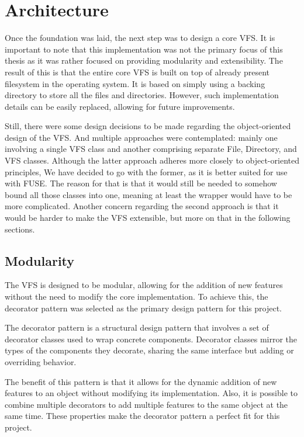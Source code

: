 \section{Architecture}\label{sec:architecture}

Once the foundation was laid, the next step was to design a core VFS\@.
It is important to note that this implementation was not the primary focus of this thesis as it was rather focused on providing modularity and extensibility.
The result of this is that the entire core VFS is built on top of already present filesystem in the operating system.
It is based on simply using a backing directory to store all the files and directories.
However, such implementation details can be easily replaced, allowing for future improvements.

Still, there were some design decisions to be made regarding the object-oriented design of the VFS\@.
And multiple approaches were contemplated: mainly one involving a single VFS class and another comprising separate File, Directory, and VFS classes.
Although the latter approach adheres more closely to object-oriented principles, We have decided to go with the former, as it is better suited for use with FUSE\@.
The reason for that is that it would still be needed to somehow bound all those classes into one, meaning at least the wrapper would have to be more complicated.
Another concern regarding the second approach is that it would be harder to make the VFS extensible, but more on that in the following sections.

\subsection{Modularity}\label{subsec:modularity}

The VFS is designed to be modular, allowing for the addition of new features without the need to modify the core implementation.
To achieve this, the decorator pattern was selected as the primary design pattern for this project.

The decorator pattern is a structural design pattern that involves a set of decorator classes used to wrap concrete components.
Decorator classes mirror the types of the components they decorate, sharing the same interface but adding or overriding behavior.

The benefit of this pattern is that it allows for the dynamic addition of new features to an object without modifying its implementation.
Also, it is possible to combine multiple decorators to add multiple features to the same object at the same time.
These properties make the decorator pattern a perfect fit for this project.

